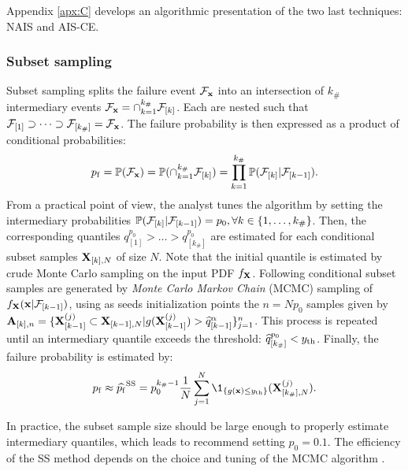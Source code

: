  
Appendix \ref{apx:C} develops an algorithmic presentation of the two last techniques: NAIS and AIS-CE.



\newpage

\subsubsection{Subset sampling}

Subset sampling splits the failure event $\mathcal{F}_{{\bf x}}$ into an intersection of $k_\#$ intermediary events $\mathcal{F}_{{\bf x}} = \cap_{k=1}^{k_\#} \mathcal{F}_{[k]}$.
Each are nested such that $\mathcal{F}_{[1]} \supset \dots \supset \mathcal{F}_{[k_\#]} = \mathcal{F}_{{\bf x}}$.
The failure probability is then expressed as a product of conditional probabilities:
\begin{equation}
    p_\mathrm{f} = \mathbb{P}(\mathcal{F}_{{\bf x}}) = \mathbb{P}(\cap_{k=1}^{k_\#} \mathcal{F}_{[k]}) = \prod_{k=1}^{k_\#} \mathbb{P}(\mathcal{F}_{[k]} | \mathcal{F}_{[k-1]}).
\end{equation}
From a practical point of view, the analyst tunes the algorithm by setting the intermediary probabilities $\mathbb{P}(\mathcal{F}_{[k]} | \mathcal{F}_{[k-1]}) = p_0, \forall k \in \{1, \dots, k_\# \}$. 
Then, the corresponding quantiles $q_{[1]}^{p_0} > \dots > q_{[k_\#]}^{p_0}$ are estimated for each conditional subset samples ${\bf X}_{[k], N}$ of size $N$. 
Note that the initial quantile is estimated by crude Monte Carlo sampling on the input PDF $f_{{\bf X}}$. 
Following conditional subset samples are generated by \textit{Monte Carlo Markov Chain} (MCMC) sampling of $f_{{\bf X}}({\bf x} |\mathcal{F}_{[k-1]})$, using as seeds initialization points the $n= N p_0$ samples given by $\mathbf{A}_{[k], n}=\{{\bf X}_{[k-1]}^{(j)} \subset {\bf X}_{[k-1], N}| g({\bf X}_{[k-1]}^{(j)}) > \widehat{q}_{[k-1]}^\alpha \}_{j=1}^n$. 
This process is repeated until an intermediary quantile exceeds the threshold: $\widehat{q}_{[k_\#]}^{p_0} < y_\mathrm{th}$. 
Finally, the failure probability is estimated by:
\begin{equation}
    \pf \approx \widehat{\pf}^{\mathrm{SS}} = p_0^{k_\# -1} \frac1N \sum_{j=1}^N \1_{\{g(\bx) \leq \yth\}} (\bX_{[k_\#],N}^{(j)}).
\end{equation}

In practice, the subset sample size should be large enough to properly estimate intermediary quantiles, which leads \cite{AuBeck2001} to recommend setting $p_0=0.1$. 
The efficiency of the SS method depends on the choice and tuning of the MCMC algorithm \citep{Papaioannou_PEM_2015}.


